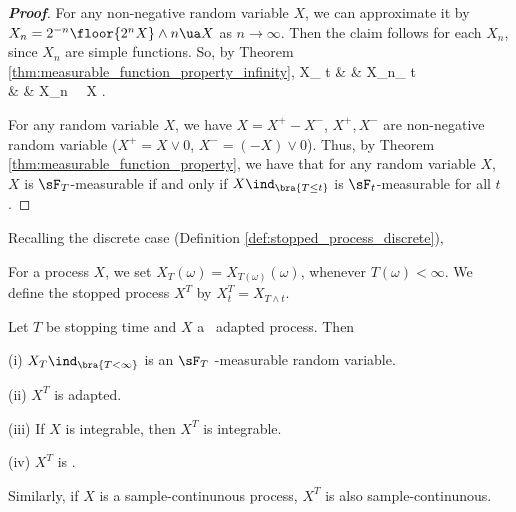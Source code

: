 \begin{proof}[\bf Proof]

For any non-negative random variable $X$, we can approximate it by $X_n = 2^{-n}\floor{2^nX} \land n \ua X$ as $n \to \infty$. Then the claim follows for
each $X_n$, since $X_n$ are simple functions. So, by Theorem \ref{thm:measurable_function_property_infinity},
\beast
X\ind_{} t & \lra & X_n\ind_{} t\\
& \lra & X_n  \ \lra \ X .
\eeast

For any random variable $X$, we have $X = X^+ - X^-$, $X^+,X^-$ are non-negative random variable ($X^+ = X\vee 0$, $X^- = (-X)\vee 0$). Thus, by Theorem \ref{thm:measurable_function_property}, we have that for any random variable $X$, $X$ is $\sF_T$-measurable if and only if $X\ind_{\bra{T \leq t}}$ is $\sF_t$-measurable for all $t$.
\end{proof}

Recalling the discrete case (Definition \ref{def:stopped_process_discrete}),

\begin{definition}\label{def:stopped_process_continuous}
For a process $X$, we set $X_T (\omega) = X_{T(\omega)}(\omega)$, whenever $T(\omega) < \infty$. We define the stopped process $X^T$ by $X^T_t = X_{T\land t}$.
\end{definition}

\begin{proposition}\label{pro:cadlag_adapted_process_property}
Let $T$ be stopping time and $X$ a \cadlag\ adapted process. Then
\ben
\item [(i)] $X_T\ind_{\bra{T < \infty}}$ is an $\sF_T$ -measurable random variable.
\item [(ii)] $X^T$ is adapted.
\item [(iii)] If $X$ is integrable, then $X^T$ is integrable.
\item [(iv)] $X^T$ is \cadlag.
\een
\end{proposition}

\begin{remark}
Similarly, if $X$ is a sample-continunous process, $X^T$ is also sample-continunous.
\end{remark}

